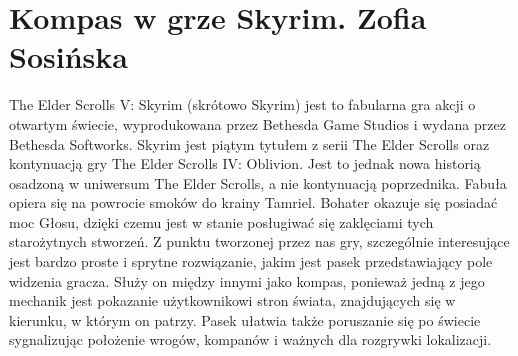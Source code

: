 \section{Kompas w grze Skyrim. Zofia Sosińska}\label{chap:skrm}

The Elder Scrolls V: Skyrim (skrótowo Skyrim) jest to fabularna gra akcji o otwartym świecie, wyprodukowana przez Bethesda Game Studios i wydana przez Bethesda Softworks. Skyrim jest piątym tytułem z serii The Elder Scrolls oraz kontynuacją gry The Elder Scrolls IV: Oblivion. Jest to jednak nowa historią osadzoną w uniwersum The Elder Scrolls, a nie kontynuacją poprzednika. Fabuła opiera się na powrocie smoków do krainy Tamriel. Bohater okazuje się posiadać moc Głosu, dzięki czemu jest w stanie posługiwać się zaklęciami tych starożytnych stworzeń.
	Z punktu tworzonej przez nas gry, szczególnie interesujące jest  bardzo proste i sprytne rozwiązanie, jakim jest pasek przedstawiający pole widzenia gracza. Służy on między innymi jako kompas, ponieważ jedną z jego mechanik jest pokazanie użytkownikowi stron świata, znajdujących się w kierunku, w którym on patrzy. Pasek ułatwia także poruszanie się po świecie sygnalizując położenie wrogów, kompanów i ważnych dla rozgrywki lokalizacji.



